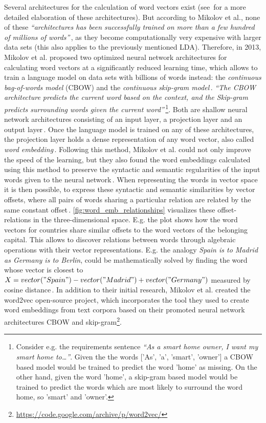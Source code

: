 Several architectures for the calculation of word vectors exist (see\,\cite{mikolov_efficient_2013,mikolov_linguistic_2013} for a more detailed elaboration of these architectures). But according to Mikolov et al., none of these \textit{``architectures has been successfully trained on more than a few hundred of millions of words''}\,\cite[p1]{mikolov_efficient_2013}, as they become computationally very expensive with larger data sets (this also applies to the previously mentioned LDA). Therefore, in 2013, Mikolov et al. proposed two optimized neural network architectures for calculating word vectors at a significantly reduced learning time, which allows to train a language model on data sets with billions of words instead: the \emph{continuous bag-of-words model} (CBOW) and the \emph{continuous skip-gram model}\,\cite{mikolov_efficient_2013}.
\textit{``The CBOW architecture predicts the current word based on the context, and the Skip-gram predicts surrounding words given the current word''}\,\cite{mikolov_efficient_2013}\footnote{Consider e.g. the requirements sentence \textit{``As a smart home owner, I want my smart home to\dots''}. Given the the words ['As', 'a', 'smart', 'owner'] a CBOW based model would be trained to predict the word 'home' as missing. On the other hand, given the word 'home', a skip-gram based model would be trained to predict the words which are most likely to surround the word home, so 'smart' and 'owner'.}. Both are shallow neural network architectures consisting of an input layer, a projection layer and an output layer\,\cite{mikolov_efficient_2013,qiang_topic_2016}. Once the language model is trained on any of these architectures, the projection layer holds a dense representation of any word vector, also called \textit{word embedding}\,\cite{tensorflow_word_embeddings}. Following this method, Mikolov et al. could not only improve the speed of the learning, but they also found the word embeddings calculated using this method to preserve the syntactic and semantic regularities of the input words given to the neural network\,\cite{mikolov_linguistic_2013}. When representing the words in vector space it is then possible, to express these syntactic and semantic similarities by vector offsets, where all pairs of words sharing a particular relation are related by the same constant offset\,\cite{mikolov_linguistic_2013}. \autoref{fig:word_emb_relationships} visualizes these offset-relations in the three-dimensional space. E.g. the  plot shows how the word vectors for countries share similar offsets to the word vectors of the belonging capital. This allows to discover relations between words through algebraic operations with their vector representations. E.g. the analogy \textit{Spain is to Madrid as Germany is to Berlin}, could be mathematically solved by finding the word whose vector is closest to $X = vector("Spain") - vector("Madrid") + vector("Germany")$ measured by cosine distance\,\cite{mikolov_efficient_2013}. In addition to their initial research, Mikolov et al. created the word2vec open-source project, which incorporates the tool they used to create word embeddings from text corpora based on their promoted neural network architectures CBOW and skip-gram\footnote{\label{word2vec_link}\url{https://code.google.com/archive/p/word2vec/}}.

